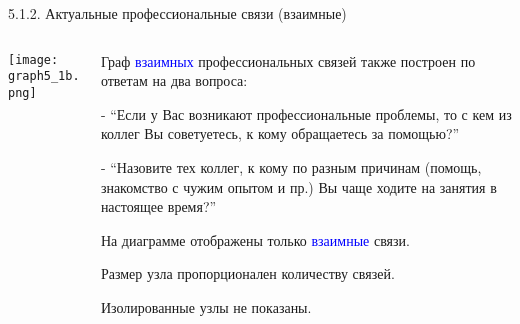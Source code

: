 \begin{frame}{5.1.2. Актуальные профессиональные связи (взаимные)}

\begin{columns}
\begin{column}{0.75\textwidth} 
\centering
          \texttt{[image: graph5\_1b.png]}
\end{column}
\begin{column}{0.25\textwidth} 

\tiny
Граф \textcolor{blue}{взаимных} профессиональных связей также построен по ответам на два вопроса:
\smallskip

- ``Если у Вас возникают профессиональные проблемы, то с кем из коллег Вы советуетесь, к кому обращаетесь за помощью?''
\smallskip

- ``Назовите тех коллег, к кому по разным причинам (помощь, знакомство с чужим опытом и пр.) Вы чаще ходите на занятия в настоящее время?''
\smallskip

На диаграмме отображены только \textcolor{blue}{взаимные} связи.
\smallskip

Размер узла пропорционален количеству связей.
\smallskip

Изолированные узлы не показаны.
\end{column}
\end{columns}
\end{frame}


